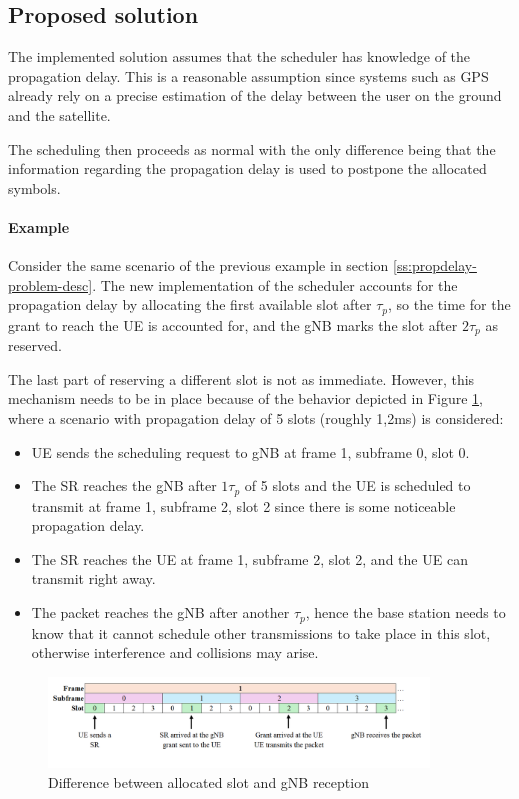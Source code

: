 \subsection{Proposed solution}
\label{ss:propdelay-problem-sol}
The implemented solution assumes that the scheduler has knowledge of the propagation delay. This is a reasonable assumption since systems such as GPS already rely on a precise estimation of the delay between the user on the ground and the satellite.

The scheduling then proceeds as normal with the only difference being that the information regarding the propagation delay is used to postpone the allocated symbols. 

\paragraph{Example} Consider the same scenario of the previous example in section \ref{ss:propdelay-problem-desc}. The new implementation of the scheduler accounts for the propagation delay by allocating the first available slot after $\tau_p$, so the time for the grant to reach the \ac{UE} is accounted for, and the \ac{gNB} marks the slot after $2\tau_p$ as reserved.

The last part of reserving a different slot is not as immediate. However, this mechanism needs to be in place because of the behavior depicted in Figure \ref{fig:scheduler-allocations-pd}, where a scenario with propagation delay of 5 slots (roughly 1,2ms) is considered:


\begin{itemize}
    \item \ac{UE} sends the scheduling request to \ac{gNB} at frame 1, subframe 0, slot 0.
    \item The \ac{SR} reaches the \ac{gNB} after $1\tau_p$ of 5 slots and the \ac{UE} is scheduled to transmit at frame 1, subframe 2, slot 2 since there is some noticeable propagation delay.
    \item The \ac{SR} reaches the \ac{UE} at frame 1, subframe 2, slot 2, and the \ac{UE} can transmit right away.
    \item The packet reaches the \ac{gNB} after another $\tau_p$, hence the base station needs to know that it cannot schedule other transmissions to take place in this slot, otherwise interference and collisions may arise.
\end{itemize}

\begin{figure}[ht]
    \centering
    \includegraphics[width=0.9\textwidth]{res/scheduler-allocation-pd.png}
    \caption{Difference between allocated slot and gNB reception}
    \label{fig:scheduler-allocations-pd}
\end{figure}

